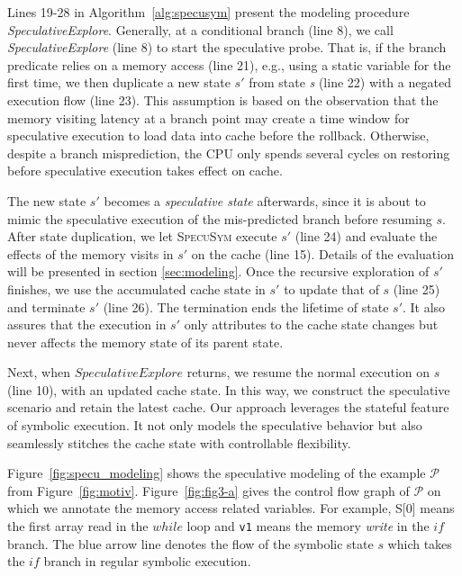 \documentclass[sigconf]{acmart}
\newcommand{\SpecuSym}{\textsc{SpecuSym} }
\newcommand{\prog}{\mathcal{P}}
\newcommand{\HB}[1]{\textcolor{blue}{Huibo}{\textcolor{red}{#1}}}
\begin{document}
Lines 19-28 in Algorithm~\ref{alg:specusym} present the modeling procedure 
\textit{SpeculativeExplore}. Generally, at a conditional branch (line 8), 
we call \textit{SpeculativeExplore} (line 8) to start the speculative probe. 
That is, if the branch predicate relies on a memory access (line 21), e.g.,
using a static variable for the first time, we then duplicate a new state 
$s'$ from state \textit{s} (line 22) with a negated execution flow (line 23). 
This assumption is based on the observation that the memory visiting latency 
at a branch point may create a time window for speculative execution to load 
data into cache before the rollback. Otherwise, despite a branch misprediction, 
the CPU only spends several cycles on restoring before speculative execution 
takes effect on cache.



The new state ${s'}$ becomes a \textit{speculative state} afterwards, since 
it is about to mimic the speculative execution of the mis-predicted branch 
before resuming $s$. After state duplication, we let \SpecuSym execute $s'$ 
(line 24) and evaluate the effects of the memory visits in $s'$ on the cache 
(line 15). Details of the evaluation will be presented in section
\ref{sec:modeling}. Once the recursive exploration of $s'$ finishes, we use 
the accumulated cache state in $s'$ to update that of $s$ (line 25) and 
terminate $s'$ (line 26). The termination ends the lifetime of state $s'$. 
It also assures that the execution in $s'$ only attributes to the cache 
state changes but never affects the memory state of its parent state.



Next, when $\mathit{SpeculativeExplore}$ returns, we resume the normal 
execution on $s$ (line 10), with an updated cache state. In this way, 
we construct the speculative scenario and retain the latest cache. Our 
approach leverages the stateful feature of symbolic execution. It not only 
models the speculative behavior but also seamlessly stitches the cache
state with controllable flexibility. 


Figure~\ref{fig:specu_modeling} shows the speculative modeling of 
the example $\prog$ from Figure~\ref{fig:motiv}. Figure~\ref{fig:fig3-a} 
gives the control flow graph of $\prog$ on which we annotate the memory 
access related variables. For example, {S[0]} means the first array read in the 
$\mathit{while}$ loop and \texttt{v1} means the memory \emph{write} in 
the $\mathit{if}$ branch. The blue arrow line denotes the flow of the 
symbolic state $s$ which takes the $\mathit{if}$ branch in regular 
symbolic execution. 
\end{document}
